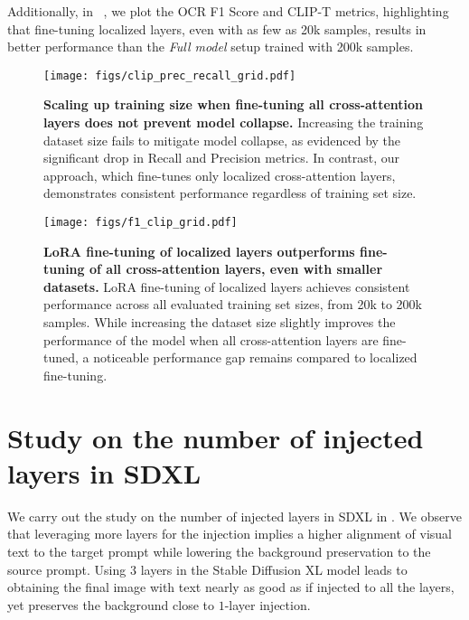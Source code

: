 Additionally, in ~, we plot the OCR F1 Score and CLIP-T metrics, highlighting that fine-tuning localized layers, even with as few as 20k samples, results in better performance than the \textit{Full model} setup trained with 200k samples.



\begin{figure}[h]
    \centering
    \texttt{[image: figs/clip\_prec\_recall\_grid.pdf]}
    \caption{\textbf{Scaling up training size when fine-tuning all cross-attention layers does not prevent model collapse.} Increasing the training dataset size fails to mitigate model collapse, as evidenced by the significant drop in Recall and Precision metrics. In contrast, our approach, which fine-tunes only localized cross-attention layers, demonstrates consistent performance regardless of training set size.
        \label{fig:prec_rec_clip_scaled}}
\end{figure}

\begin{figure}[h]
    \centering
    \texttt{[image: figs/f1\_clip\_grid.pdf]}
    \caption{\textbf{LoRA fine-tuning of localized layers outperforms fine-tuning of all cross-attention layers, even with smaller datasets.} LoRA fine-tuning of localized layers achieves consistent performance across all evaluated training set sizes, from 20k to 200k samples. While increasing the dataset size slightly improves the performance of the model when all cross-attention layers are fine-tuned, a noticeable performance gap remains compared to localized fine-tuning.
        \label{fig:f1_clip_scaled}}
\end{figure}

\section{Study on the number of injected layers in SDXL}
\label{app:layers_study}

We carry out the study on the number of injected layers in SDXL in . We observe that leveraging more layers for the injection implies a higher alignment of visual text to the target prompt while lowering the background preservation to the source prompt. Using $3$ layers in the Stable Diffusion XL model leads to obtaining the final image with text nearly as good as if injected to all the layers, yet preserves the background close to $1$-layer injection.

